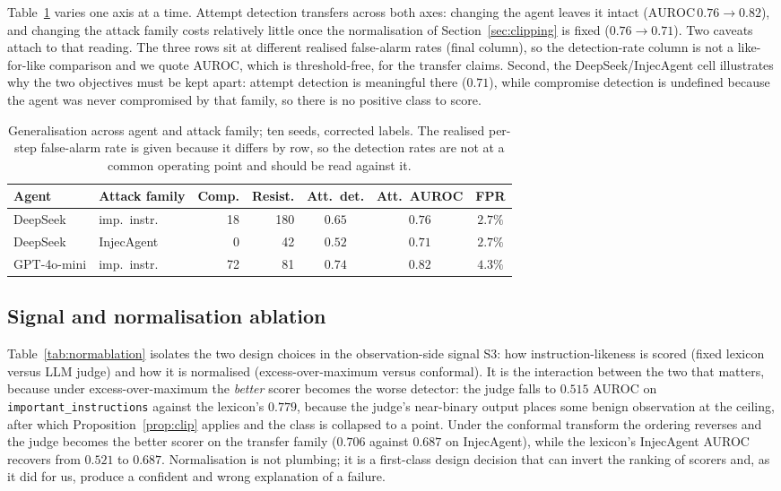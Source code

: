 \documentclass[pdflatex,sn-basic]{sn-jnl}%
\theoremstyle{thmstyleone}
\theoremstyle{thmstyletwo}
\theoremstyle{thmstylethree}
\begin{document}
Table~\ref{tab:generalisation} varies one axis at a time. Attempt detection
transfers across both axes: changing the agent leaves it intact
($\mathrm{AUROC}\,0.76 \to 0.82$), and changing the attack family costs
relatively little once the normalisation of Section~\ref{sec:clipping} is fixed
($0.76 \to 0.71$). Two caveats attach to that reading. The three rows sit at different realised
false-alarm rates (final column), so the detection-rate column is not a
like-for-like comparison and we quote AUROC, which is threshold-free, for the
transfer claims. Second, the DeepSeek/InjecAgent cell illustrates why the two
objectives must be kept apart: attempt detection is meaningful there ($0.71$),
while compromise detection is undefined because the agent was never compromised by
that family, so there is no positive class to score.

\begin{table}[t]
\centering
\caption{Generalisation across agent and attack family; ten seeds, corrected
labels. The realised per-step false-alarm rate is given because it differs by row,
so the detection rates are not at a common operating point and should be
read against it.}
\label{tab:generalisation}
\small
\setlength{\tabcolsep}{4pt}
\begin{tabular}{@{}llrrccc@{}}
\toprule
Agent & Attack family & Comp. & Resist. & Att.\ det. & Att.\ AUROC & FPR \\
\midrule
DeepSeek & imp.\ instr. & 18 & 180 & $0.65$ & $0.76$ & $2.7\%$ \\
DeepSeek & InjecAgent & 0 & 42 & $0.52$ & $0.71$ & $2.7\%$ \\
GPT-4o-mini & imp.\ instr. & 72 & 81 & $0.74$ & $0.82$ & $4.3\%$ \\
\bottomrule
\end{tabular}
\end{table}

\subsection{Signal and normalisation ablation}\label{sec:ablation}

Table~\ref{tab:normablation} isolates the two design choices in the
observation-side signal S3: how instruction-likeness is scored (fixed lexicon
versus LLM judge) and how it is normalised (excess-over-maximum versus conformal).
It is the interaction between the two that matters, because under
excess-over-maximum the \emph{better} scorer becomes the worse detector: the judge
falls to $0.515$ AUROC on
\texttt{important\_instructions} against the lexicon's $0.779$, because the
judge's near-binary output places some benign observation at the ceiling, after
which Proposition~\ref{prop:clip} applies and the class is collapsed to a point.
Under the conformal transform the ordering reverses and the judge becomes the
better scorer on the transfer family ($0.706$ against $0.687$ on InjecAgent), while
the lexicon's InjecAgent AUROC recovers from $0.521$ to $0.687$. Normalisation is
not plumbing; it is a first-class design decision that can invert the ranking of
scorers and, as it did for us, produce a confident and wrong explanation of a
failure.
\end{document}
